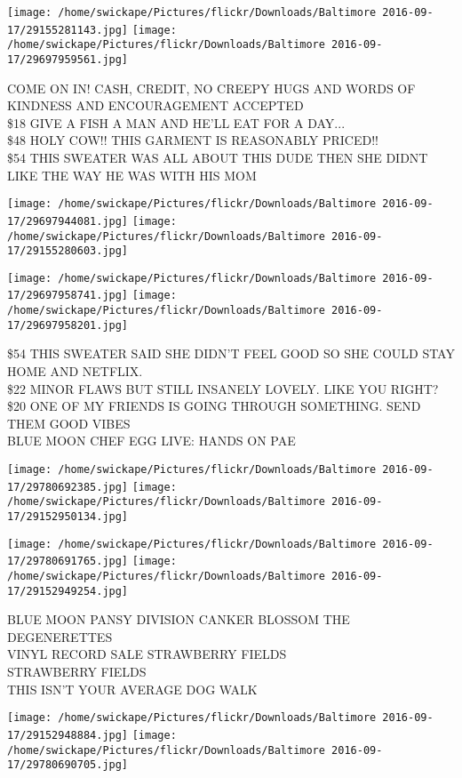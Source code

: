 \documentclass[10pt,letterpaper]{article}
\begin{document}
\texttt{[image: /home/swickape/Pictures/flickr/Downloads/Baltimore 2016-09-17/29155281143.jpg]}
\texttt{[image: /home/swickape/Pictures/flickr/Downloads/Baltimore 2016-09-17/29697959561.jpg]}

COME ON IN!  CASH, CREDIT, NO CREEPY HUGS AND WORDS OF KINDNESS AND ENCOURAGEMENT ACCEPTED\\
\$18 GIVE A FISH A MAN AND HE'LL EAT FOR A DAY...\\
\$48 HOLY COW!! THIS GARMENT IS REASONABLY PRICED!!\\
\$54 THIS SWEATER WAS ALL ABOUT THIS DUDE THEN SHE DIDNT LIKE THE WAY HE WAS WITH HIS MOM
\pagebreak

\texttt{[image: /home/swickape/Pictures/flickr/Downloads/Baltimore 2016-09-17/29697944081.jpg]}
\texttt{[image: /home/swickape/Pictures/flickr/Downloads/Baltimore 2016-09-17/29155280603.jpg]}

\texttt{[image: /home/swickape/Pictures/flickr/Downloads/Baltimore 2016-09-17/29697958741.jpg]}
\texttt{[image: /home/swickape/Pictures/flickr/Downloads/Baltimore 2016-09-17/29697958201.jpg]}

\$54 THIS SWEATER SAID SHE DIDN'T FEEL GOOD SO SHE COULD STAY HOME AND NETFLIX.\\
\$22 MINOR FLAWS BUT STILL INSANELY LOVELY.  LIKE YOU RIGHT?\\
\$20 ONE OF MY FRIENDS IS GOING THROUGH SOMETHING.  SEND THEM GOOD VIBES\\
BLUE MOON CHEF EGG LIVE: HANDS ON PAE
\pagebreak

\texttt{[image: /home/swickape/Pictures/flickr/Downloads/Baltimore 2016-09-17/29780692385.jpg]}
\texttt{[image: /home/swickape/Pictures/flickr/Downloads/Baltimore 2016-09-17/29152950134.jpg]}

\texttt{[image: /home/swickape/Pictures/flickr/Downloads/Baltimore 2016-09-17/29780691765.jpg]}
\texttt{[image: /home/swickape/Pictures/flickr/Downloads/Baltimore 2016-09-17/29152949254.jpg]}

BLUE MOON PANSY DIVISION CANKER BLOSSOM THE DEGENERETTES\\
VINYL RECORD SALE STRAWBERRY FIELDS\\
STRAWBERRY FIELDS\\
THIS ISN'T YOUR AVERAGE DOG WALK
\pagebreak

\texttt{[image: /home/swickape/Pictures/flickr/Downloads/Baltimore 2016-09-17/29152948884.jpg]}
\texttt{[image: /home/swickape/Pictures/flickr/Downloads/Baltimore 2016-09-17/29780690705.jpg]}
\end{document}
